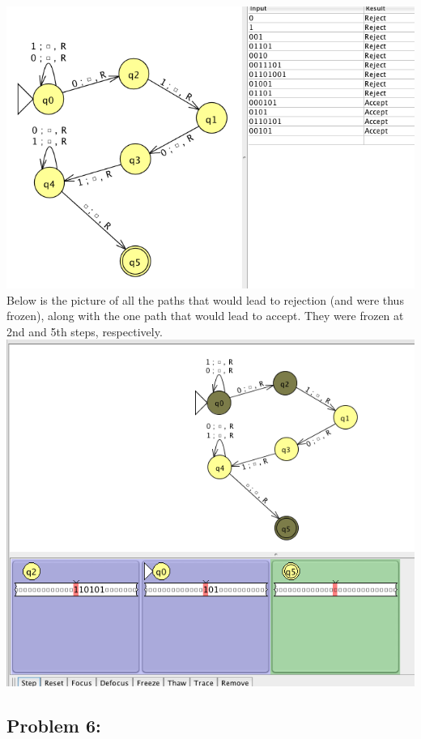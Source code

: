\documentclass[a4paper]{article}
\begin{document}
\includegraphics[scale=0.4]{p5_tm_and_trace.png} \\

Below is the picture of all the paths that would lead to rejection (and were thus frozen), along with the one path that would lead to accept. They were frozen at 2nd and 5th steps, respectively. \\

\includegraphics[scale=0.4]{p5_freeze.png} \\

\subsection*{Problem 6:}
\end{document}
